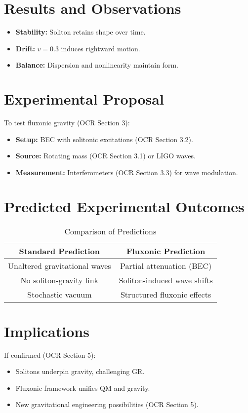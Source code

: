 \documentclass{article}
\begin{document}
\section{Results and Observations}
\begin{itemize}
    \item \textbf{Stability:} Soliton retains shape over time.
    \item \textbf{Drift:} \(v = 0.3\) induces rightward motion.
    \item \textbf{Balance:} Dispersion and nonlinearity maintain form.
\end{itemize}

\section{Experimental Proposal}
To test fluxonic gravity (OCR Section 3):
\begin{itemize}
    \item \textbf{Setup:} BEC with solitonic excitations (OCR Section 3.2).
    \item \textbf{Source:} Rotating mass (OCR Section 3.1) or LIGO waves.
    \item \textbf{Measurement:} Interferometers (OCR Section 3.3) for wave modulation.
\end{itemize}

\section{Predicted Experimental Outcomes}
\begin{table}[h]
    \centering
    \begin{tabular}{|c|c|}
        \hline
        \textbf{Standard Prediction} & \textbf{Fluxonic Prediction} \\
        \hline
        Unaltered gravitational waves & Partial attenuation (BEC) \\
        No soliton-gravity link & Soliton-induced wave shifts \\
        Stochastic vacuum & Structured fluxonic effects \\
        \hline
    \end{tabular}
    \caption{Comparison of Predictions}
    \label{tab:predictions}
\end{table}

\section{Implications}
If confirmed (OCR Section 5):
\begin{itemize}
    \item Solitons underpin gravity, challenging GR.
    \item Fluxonic framework unifies QM and gravity.
    \item New gravitational engineering possibilities (OCR Section 5).
\end{itemize}
\end{document}
